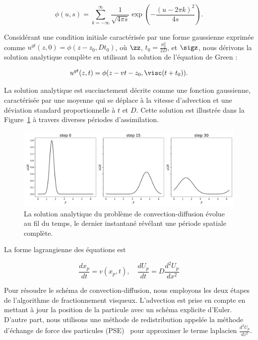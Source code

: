 \begin{equation*}
    \phi(u, s) = \sum_{k=-\infty}^{\infty} \frac{1}{\sqrt{4 \pi s}} \exp{\left(-\frac{{(u - 2\pi k)}^2}{4s} \right)}.
\end{equation*}

Considérant une condition initiale caractérisée par une forme gaussienne exprimée comme $u^{gt}(z, 0) = \phi(z-z_0, Dt_0)$, où $\zz$, $t_0 = \frac{\sigma_0^2}{2D}$, et $\sigz$, nous dérivons la solution analytique complète en utilisant la solution de l'équation de Green :

\begin{equation*}
    u^{gt}(z, t) = \phi(z- v t - z_0, \visc (t+t_0)).
\end{equation*}

La solution analytique est succinctement décrite comme une fonction gaussienne, caractérisée par une moyenne qui se déplace à la vitesse d'advection et une déviation standard proportionnelle à $t$ et $D$. Cette solution est illustrée dans la Figure~\ref{fig:1d_analytical} à travers diverses périodes d'assimilation.

\begin{figure}[ht]
    \centering
    \includegraphics[width=\linewidth]{images/app1d/analytical_frame.pdf}
    \caption{La solution analytique du problème de convection-diffusion évolue au fil du temps, le dernier instantané révélant une période spatiale complète.}
    \label{fig:1d_analytical}
\end{figure}

La forme lagrangienne des équations est

\begin{equation*}
    \frac{dx_p}{dt} = v(x_p, t), \quad \frac{dU_p}{dt} = D \frac{d^2 U_p}{dx^2}
\end{equation*}

Pour résoudre le schéma de convection-diffusion, nous employons les deux étapes de l'algorithme de fractionnement visqueux. L'advection est prise en compte en mettant à jour la position de la particule avec un schéma explicite d'Euler.
D'autre part, nous utilisons une méthode de redistribution appelée la méthode d'échange de force des particules (PSE)~\cite{degond_1989,cottet_1990} pour approximer le terme laplacien $\frac{d^2 U_p}{dz^2}$.

